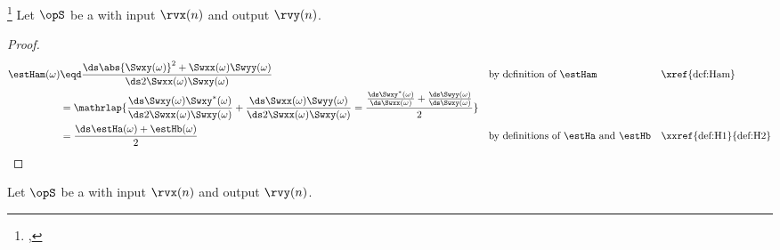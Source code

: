 \begin{proposition}
\footnote{
  ,
  }
\label{prop:Ham}
Let $\opS$ be a  with input $\rvx(n)$ and output $\rvy(n)$.
\end{proposition}
\begin{proof}
\begin{align*}
  \estHam(\omega)
    &\eqd  \frac{\ds\abs{\Swxy(\omega)}^2 + \Swxx(\omega)\Swyy(\omega)}
                {\ds2\Swxx(\omega)\Swxy(\omega)}
    && \text{by definition of $\estHam$}
    && \text{\xref{def:Ham}}
  \\&=\mathrlap{
        \frac{\ds \Swxy(\omega) \Swxy^\ast(\omega)}
             {\ds2\Swxx(\omega) \Swxy     (\omega)}
      + \frac{\ds \Swxx(\omega) \Swyy     (\omega)}
             {\ds2\Swxx(\omega) \Swxy     (\omega)}
     =  \frac{
        \frac{\ds\Swxy^\ast(\omega)} {\ds\Swxx(\omega)}
      + \frac{\ds\Swyy     (\omega)} {\ds\Swxy(\omega)}
        }{2}
     }
  \\&= \frac{\ds\estHa(\omega) + \estHb(\omega)}{2}
    && \text{by definitions of $\estHa$ and $\estHb$}
    && \text{\xxref{def:H1}{def:H2}}
\end{align*}
\end{proof}

\begin{definition}                      %
\label{def:Hgm}                         %
Let $\opS$ be a  with input $\rvx(n)$ and output $\rvy(n)$.
\end{definition}

